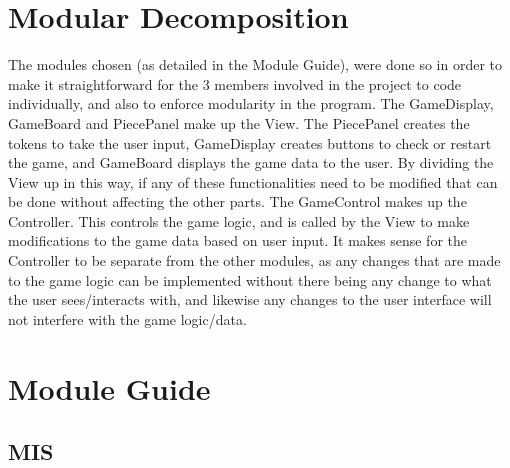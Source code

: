 \documentclass[12pt]{article}
\begin{document}
	\section{Modular Decomposition}
		\begin{figure}[!h]
			\centering
		\end{figure}
	The modules chosen (as detailed in the Module Guide), were done so in order to make it straightforward for the 3 members involved in the project to code individually, and also to enforce modularity in the program. The GameDisplay, GameBoard and PiecePanel make up the View. The PiecePanel creates the tokens to take the user input, GameDisplay creates buttons to check or restart the game, and GameBoard displays the game data to the user. By dividing the View up in this way, if any of these functionalities need to be modified that can be done without affecting the other parts. The GameControl makes up the Controller. This controls the game logic, and is called by the View to make modifications to the game data based on user input. It makes sense for the Controller to be separate from the other modules, as any changes that are made to the game logic can be implemented without there being any change to what the user sees/interacts with, and likewise any changes to the user interface will not interfere with the game logic/data.
	\newpage
	\section{Module Guide}
	\subsection{MIS}
\end{document}
